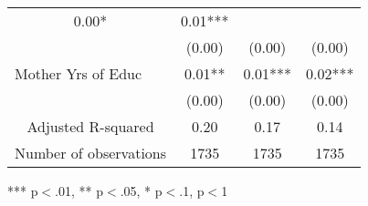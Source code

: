 \begin{tabular}{llll}
  \multicolumn{1}{c}{0.00* } &
  \multicolumn{1}{c}{0.01***} \\
\multicolumn{1}{l}{} &
  \multicolumn{1}{|c}{(0.00)} &
  \multicolumn{1}{c}{(0.00)} &
  \multicolumn{1}{c}{(0.00)} \\
\multicolumn{1}{l}{Mother Yrs of Educ} &
  \multicolumn{1}{|c}{0.01** } &
  \multicolumn{1}{c}{0.01***} &
  \multicolumn{1}{c}{0.02***} \\
\multicolumn{1}{l}{} &
  \multicolumn{1}{|c}{(0.00)} &
  \multicolumn{1}{c}{(0.00)} &
  \multicolumn{1}{c}{(0.00)} \\
\multicolumn{1}{c}{Adjusted R-squared} &
  \multicolumn{1}{|c}{0.20} &
  \multicolumn{1}{c}{0.17} &
  \multicolumn{1}{c}{0.14} \\
\multicolumn{1}{c}{Number of observations} &
  \multicolumn{1}{|c}{1735} &
  \multicolumn{1}{c}{1735} &
  \multicolumn{1}{c}{1735} \\
\cline{1-4}
\end{tabular}

\footnotesize{
*** p$<$.01, ** p$<$.05, * p$<$.1,  p$<$1
}
